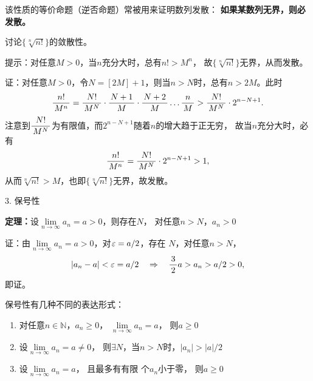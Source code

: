 该性质的等价命题（逆否命题）常被用来证明数列发散：
{\bf 如果某数列无界，则必发散。}

\begin{shaded}
	\egz 讨论$\{\sqrt[n]{n!}\}$的敛散性。

	提示：对任意$M>0$，当$n$充分大时，总有$n!>M^n$，
	故$\{\sqrt[n]{n!}\}$无界，从而发散。

	证：对任意$M>0$，令$N=[2M]+1$，则当$n>N$时，总有$n>2M$。此时
	$$\displaystyle\frac{\,{n!}\,}{\,{M^n}\,}=\displaystyle\frac{\,{N!}\,}{\,{M^N}\,}\cdot\displaystyle\frac{\,{N+1}\,}{\,{M}\,}
	\cdot\displaystyle\frac{\,{N+2}\,}{\,{M}\,}\ldots\displaystyle\frac{\,{n}\,}{\,{M}\,}>\displaystyle\frac{\,{N!}\,}{\,{M^N}\,}\cdot2^{n-N+1}.$$
	注意到$\displaystyle\frac{\,{N!}\,}{\,{M^N}\,}$为有限值，而$2^{n-N+1}$随着$n$的增大趋于正无穷，
	故当$n$充分大时，必有
	$$\displaystyle\frac{\,{n!}\,}{\,{M^n}\,}=\displaystyle\frac{\,{N!}\,}{\,{M^N}\,}\cdot2^{n-N+1}>1,$$
	从而$\sqrt[n]{n!}>M$，也即$\{\sqrt[n]{n!}\}$无界，故发散。\fin
\end{shaded}

\bs
{3. 保号性}
\begin{thx}
	{\bf 定理：}设$\lim\limits_{n\to\infty}a_n=a>0$，则存在$N$，
	对任意$n>N$，$a_n>0$	
\end{thx}

证：由$\lim\limits_{n\to\infty}a_n=a>0$，对$\varepsilon=a/2$，存在
$N$，对任意$n>N$，
$$|a_n-a|<\varepsilon=a/2\quad\Rightarrow\quad \displaystyle\frac{\,{3}\,}{\,{2}\,}a>a_n>a/2>0,$$
即证。\fin
		
保号性有几种不同的表达形式：
\begin{thx}
	\begin{enumerate}[\bf 推论1：]
	  \item 对任意$n\in\mathbb{N}$，$a_n\geq
	  0$， $\lim\limits_{n\to\infty}a_n=a$， 则$a\geq 0$
	  \item 设$\lim\limits_{n\to\infty}a_n=a\ne
	  0$， 则$\exists N$，当$n>N$时，$|a_n|>|a|/2$
	  \item  设$\lim\limits_{n\to\infty}a_n=a$， 且最多有有限
	  个$a_n$小于零， 则$a\geq 0$
	\end{enumerate}	
\end{thx}

